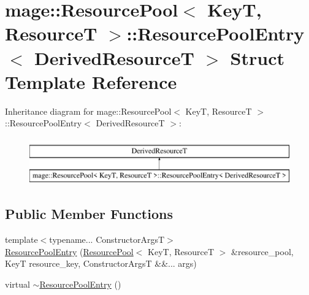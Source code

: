 \hypertarget{structmage_1_1_resource_pool_1_1_resource_pool_entry}{}\section{mage\+:\+:Resource\+Pool$<$ KeyT, ResourceT $>$\+:\+:Resource\+Pool\+Entry$<$ Derived\+ResourceT $>$ Struct Template Reference}
\label{structmage_1_1_resource_pool_1_1_resource_pool_entry}
Inheritance diagram for mage\+:\+:Resource\+Pool$<$ KeyT, ResourceT $>$\+:\+:Resource\+Pool\+Entry$<$ Derived\+ResourceT $>$\+:\begin{figure}[H]
\begin{center}
\leavevmode
\includegraphics[height=2.000000cm]{structmage_1_1_resource_pool_1_1_resource_pool_entry}
\end{center}
\end{figure}
\subsection*{Public Member Functions}
\begin{DoxyCompactItemize}
\item 
{\footnotesize template$<$typename... Constructor\+ArgsT$>$ }\\\hyperlink{structmage_1_1_resource_pool_1_1_resource_pool_entry_a8e255033a6f139f5f30e17869325eb2e}{Resource\+Pool\+Entry} (\hyperlink{classmage_1_1_resource_pool}{Resource\+Pool}$<$ KeyT, ResourceT $>$ \&resource\+\_\+pool, KeyT resource\+\_\+key, Constructor\+ArgsT \&\&... args)
\item 
virtual \hyperlink{structmage_1_1_resource_pool_1_1_resource_pool_entry_ae8d7b54f633fb865e2c299d2fd2bf466}{$\sim$\+Resource\+Pool\+Entry} ()
\end{DoxyCompactItemize}
